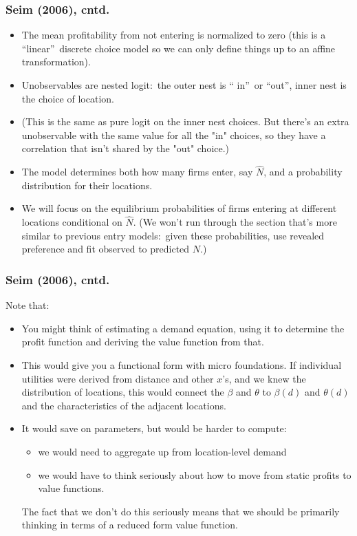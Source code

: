 \documentclass[xcolor=pdftex,dvipsnames,table,mathserif]{beamer}
\begin{document}
\begin{frame}
\frametitle{Seim (2006), cntd.}
\footnotesize
\begin{itemize}
\item The mean profitability from not entering is normalized to zero (this
is a \textquotedblleft linear\textquotedblright\ discrete choice model so we
can only define things up to an affine transformation).
\item Unobservables are nested logit:\ the outer nest is \textquotedblleft
in\textquotedblright\ or \textquotedblleft out\textquotedblright , inner
nest is the choice of location.
\item (This is the same as pure logit on the inner nest choices. But there's
an extra unobservable with the same value for all the "in" choices, so they
have a correlation that isn't shared by the "out" choice.)
\item The model determines both how many firms enter, say $\hat{N}$, and a
probability distribution for their locations.
\item We will focus on the equilibrium probabilities of firms entering at
different locations conditional on $\hat{N}$. (We won't run through the
section that's more similar to previous entry models:\ given these
probabilities, use revealed preference and fit observed to predicted $N$.)
\end{itemize}
\end{frame}

\begin{frame}
\frametitle{Seim (2006), cntd.}
\footnotesize
Note that:
\begin{itemize}
\item You might think of estimating a demand equation, using it to determine
the profit function and deriving the value function from that.
\item This would give you a functional form with micro foundations. If
individual utilities were derived from distance and other $x$'s, and we knew
the distribution of locations, this would connect the $\beta $ and $\theta $
to $\beta (d)$ and $\theta (d)$ and the characteristics of the adjacent
locations.
\item It would save on parameters, but would be harder to compute:
\begin{itemize}
\item we would need to aggregate up from location-level demand
\item we would have to think seriously about how to move from static profits
to value functions.
\end{itemize}
The fact that we don't do this seriously means that we should be primarily
thinking in terms of a reduced form value function.
\end{itemize}
\end{frame}
\end{document}
